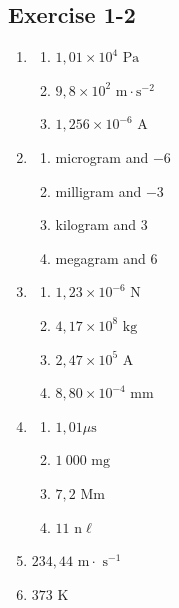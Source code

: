 \subsection{Exercise 1-2} 
\begin{multicols}{3}
\begin{enumerate}[itemsep=5pt, label=\textbf{\arabic*}. ]
\item %
    \begin{enumerate}[itemsep=5pt, label=\textbf{(\alph*)} ] 
    \item $1,01 \times 10^{4} \text{ Pa}$
    \item $9,8 \times 10^2 \text{ m} \cdot \text{s}^{−2}$
    \item $1,256 \times 10^{−6} \text{ A}$
    \end{enumerate}
\item %
    \begin{enumerate}[itemsep=5pt, label=\textbf{(\alph*)} ] 
    \item microgram and $-6$
    \item milligram and $-3$
    \item kilogram and $3$
    \item megagram and $6$
    \end{enumerate}
\item %
    \begin{enumerate}[itemsep=5pt, label=\textbf{(\alph*)} ] 
    \item $1,23 \times 10^{−6} \text{ N}$
    \item $4,17 \times 10^8 \text{ kg}$
    \item $2,47 \times 10^5 \text{ A}$
    \item $8,80 \times 10^{−4} \text{ mm}$
    \end{enumerate}
\item %
    \begin{enumerate}[itemsep=5pt, label=\textbf{(\alph*)} ] 
    \item $1,01 \mu \text{s}$
    \item $1~000 \text{ mg}$
    \item $7,2 \text{ Mm}$
    \item $11 \text{ n} \ell $
    \end{enumerate}
\item %
$234,44 \text{ m} \cdot \text{ s}^{−1}$
\item %
$373 \text{ K}$
\end{enumerate}
\end{multicols}

